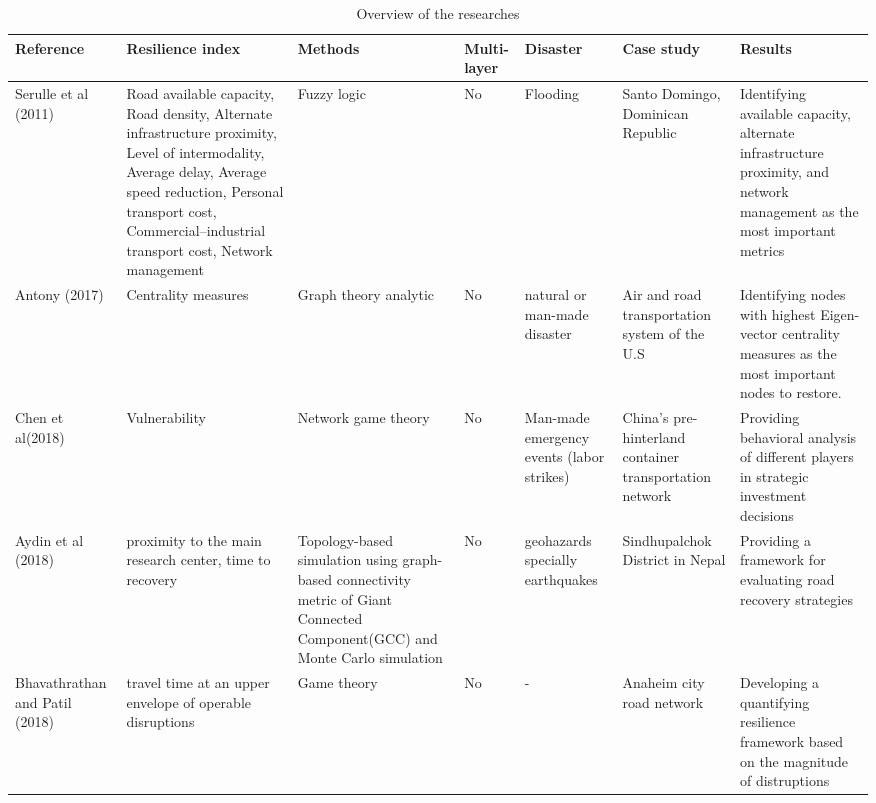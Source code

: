 \documentclass[11pt,twoside]{article}
\numberwithin{equation}{section}
\newcommand{\?}{\stackrel{?}{=}}
\begin{document}
\clearpage
{}
\begin{table}
\scriptsize
\caption{Overview of the researches}
\label{Table.Overview}
\begin{tabular}{>{\raggedright}p{} >{\raggedright}p{} >{\raggedright}p{}
     >{\raggedright}p{} >{\raggedright}p{} >{\raggedright}p{}
   p{} }
  \toprule
  \bf Reference & \bf Resilience index & \bf Methods & \bf Multi-layer & \bf Disaster & \bf Case study & \bf Results \\\midrule
  
  Serulle et al (2011) & Road available capacity,
                         Road density,
                         Alternate infrastructure proximity,
                         Level of intermodality,
                         Average delay,
                         Average speed reduction,
                         Personal transport cost, Commercial–industrial transport cost, Network management  &
                                                                                                          Fuzzy logic & No & Flooding
                                                                                      & Santo Domingo, Dominican Republic & Identifying available capacity, alternate infrastructure proximity, and network management as the most important metrics \\
  \midrule
  Antony (2017)         & Centrality measures
                                       & Graph theory analytic & No & natural or man-made disaster & Air and road transportation system of the U.S & Identifying nodes with highest Eigen-vector centrality measures as the most important nodes to restore.\\
  \midrule
  Chen et al(2018) & Vulnerability & Network game theory & No & Man-made emergency events (labor strikes) & China's pre-hinterland container transportation network & Providing behavioral analysis of different players in strategic investment decisions\\
  \midrule
  Aydin et al (2018) & proximity to the main research center, time to recovery  & Topology-based simulation using graph-based connectivity metric of Giant Connected Component(GCC) and Monte Carlo simulation & No & geohazards specially earthquakes & Sindhupalchok District in Nepal & Providing a framework for evaluating road recovery strategies\\
  \midrule
  Bhavathrathan and Patil (2018) & travel time at an upper envelope of operable disruptions & Game theory & No & - & Anaheim city road network & Developing a quantifying resilience framework based on the magnitude of distruptions\\

\end{tabular}
\end{table}
\end{document}
